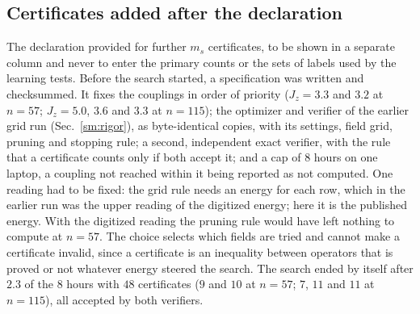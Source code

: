 \documentclass[aps,prx,onecolumn,10pt,nofootinbib,longbibliography,floatfix]{revtex4-2}
\theoremstyle{remark}
\newcommand{\Jz}{J_z}
\newcommand{\ms}{m_s}
\newcommand{\Czz}{\bar C_{zz}}
\newcommand{\W}{\mathcal{W}}
\begin{document}
\def\SMcap{Exact intervals of $\ms$ at the published energies (primary column: the certificates that existed when %
the analysis was declared). $I$: interval valid for every state of
$\W(E_{\rm pub},M_{\rm pub})\cup\W(E_{\rm pub},M_0)$, ends rounded outward; $w/\tau$ and $w/\tau_{\rm rf}$: its width
over the reference tolerance and over the reference-free tolerance, rounded up; ``at $M_0$'': the width that the
same certificates give for sector states alone; margin: the greatest energy error at which the row stays certified,
over the published one, rounded down; miss: distance of the public label from the reference value, rounded up.}\def\SMlab{tab:rd_exact_ms}


\def\SMcap{Exact intervals of $\Czz$ at the published energies; columns as in Table~\ref{tab:rd_exact_ms}. %
$^{\S}$: outside the range of couplings fixed in the declaration; such a row is reported and never counted.}\def\SMlab{tab:rd_exact_czz}


\subsection{Certificates added after the declaration}
\label{sm:public_e1}
The declaration provided for further $\ms$ certificates, to be shown in a separate column and never to enter the
primary counts or the sets of labels used by the learning tests. Before the search started, a specification was
written and checksummed. It fixes the couplings in order of priority ($\Jz=3.3$ and $3.2$ at $n=57$; $\Jz=5.0$, $3.6$ %
and $3.3$ at $n=115$); the optimizer and verifier of the earlier grid run (Sec.~\ref{sm:rigor}), as byte-identical %
copies, with its settings, field grid, pruning and stopping rule; a second, independent exact verifier, with the
rule that a certificate counts only if both accept it; and a cap of $8$ hours on one laptop, a coupling not reached %
within it being reported as not computed. One reading had to be fixed: the grid rule needs an energy for each row,
which in the earlier run was the upper reading of the digitized energy; here it is the published energy. With the
digitized reading the pruning rule would have left nothing to compute at $n=57$. The choice selects which fields are %
tried and cannot make a certificate invalid, since a certificate is an inequality between operators that is
proved or not whatever energy steered the search. The search ended by itself after $2.3$ of the $8$ hours with $48$ certificates ($9$ and $10$ at $n=57$; %
$7$, $11$ and $11$ at $n=115$), all accepted by both verifiers. %
\end{document}
